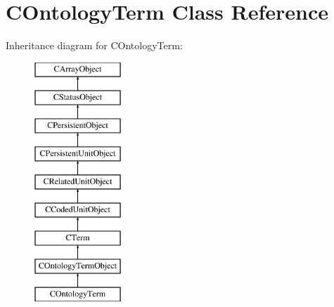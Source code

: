 \hypertarget{class_c_ontology_term}{\section{C\-Ontology\-Term Class Reference}
\label{class_c_ontology_term}
}
Inheritance diagram for C\-Ontology\-Term\-:\begin{figure}[H]
\begin{center}
\leavevmode
\includegraphics[height=9.000000cm]{class_c_ontology_term}
\end{center}
\end{figure}
